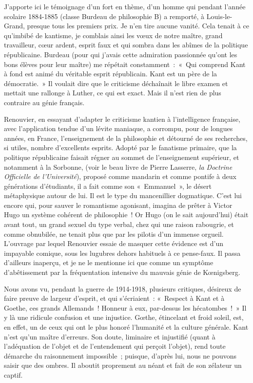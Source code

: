 \documentclass[french,twoside]{book} %
\begin{document}
J’apporte ici le témoignage d’un fort en thème, d’un homme qui pendant l’année scolaire 1884-1885 (classe Burdeau de philosophie B) a remporté, à Louis-le-Grand, presque tous les premiers prix. Je n’en tire aucune vanité. Cela tenait à ce qu’imbibé de kantisme, je comblais ainsi les vœux de notre maître, grand travailleur, cœur ardent, esprit faux et qui sombra dans les abîmes de la politique républicaine. Burdeau (pour qui j’avais cette admiration passionnée qu’ont les bons élèves pour leur maître) me répétait constamment : « Qui comprend Kant à fond est animé du véritable esprit républicain. Kant est un père de la démocratie. » Il voulait dire que le criticisme déchaînait le libre examen et mettait une rallonge à Luther, ce qui est exact. Mais il n’est rien de plus contraire au génie français.\par
Renouvier, en essayant d’adapter le criticisme kantien à l’intelligence française, avec l’application tendue d’un lévite maniaque, a corrompu, pour de longues années, en France, l’enseignement de la philosophie et détourné de ses recherches, si utiles, nombre d’excellents esprits. Adopté par le fanatisme primaire, que la politique républicaine faisait régner au sommet de l’enseignement supérieur, et notamment à la Sorbonne, (voir le beau livre de Pierre Lasserre, {\itshape la Doctrine Officielle de l’Université}), proposé comme mandarin et comme pontife à deux générations d’étudiants, il a fait comme son « Emmanuel », le désert métaphysique autour de lui. Il est le type du mancenillier dogmatique. C’est lui encore qui, pour sauver le romantisme agonisant, imagina de prêter à Victor Hugo un système cohérent de philosophie ! Or Hugo (on le sait aujourd’hui) était avant tout, un grand sexuel du type verbal, chez qui une raison rabougrie, et comme obnubilée, ne tenait plus que par les pilotis d’un immense orgueil. L’ouvrage par lequel Renouvier essaie de masquer cette évidence est d’un impayable comique, sous les lugubres dehors habituels à ce pense-faux. Il passa d’ailleurs inaperçu, et je ne le mentionne ici que comme un symptôme d’abêtissement par la fréquentation intensive du mauvais génie de Kœnigsberg.\par
Nous avons vu, pendant la guerre de 1914-1918, plusieurs critiques, désireux de faire preuve de largeur d’esprit, et qui s’écriaient : « Respect à Kant et à Goethe, ces grands Allemands ! Honneur à eux, par-dessus les hécatombes ! » Il y là une ridicule confusion et une injustice. Gœthe, étincelant et froid soleil, est, en effet, un de ceux qui ont le plus honoré l’humanité et la culture générale. Kant n’est qu’un maître d’erreurs. Son doute, liminaire et injustifié (quant à l’adéquation de l’objet et de l’entendement qui perçoit l’objet), rend toute démarche du raisonnement impossible ; puisque, d’après lui, nous ne pouvons saisir que des ombres. Il aboutit proprement au néant et fait de son zélateur un captif.\par
\end{document}
